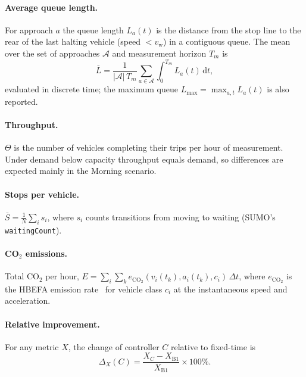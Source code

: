 \paragraph{Average queue length.} For approach $a$ the queue length $L_a(t)$ is the distance from the stop line to the rear of the last halting vehicle (speed $< v_{\text{w}}$) in a contiguous queue. The mean over the set of approaches $\mathcal{A}$ and measurement horizon $T_m$ is
\begin{equation}
  \bar{L} = \frac{1}{|\mathcal{A}|\,T_m}\sum_{a \in \mathcal{A}} \int_{0}^{T_m} L_a(t)\,\mathrm{d}t ,
  \label{eq:queue}
\end{equation}
evaluated in discrete time; the maximum queue $L_{\max} = \max_{a,t} L_a(t)$ is also reported.

\paragraph{Throughput.} $\Theta$ is the number of vehicles completing their trips per hour of measurement. Under demand below capacity throughput equals demand, so differences are expected mainly in the Morning scenario.

\paragraph{Stops per vehicle.} $\bar{S} = \frac{1}{N}\sum_i s_i$, where $s_i$ counts transitions from moving to waiting (SUMO's \texttt{waitingCount}).

\paragraph{CO$_2$ emissions.} Total CO$_2$ per hour, $E = \sum_i \sum_k e_{\text{CO}_2}(v_i(t_k), a_i(t_k), c_i)\,\Delta t$, where $e_{\text{CO}_2}$ is the HBEFA emission rate~\cite{hbefa41} for vehicle class $c_i$ at the instantaneous speed and acceleration.

\paragraph{Relative improvement.} For any metric $X$, the change of controller $C$ relative to fixed-time is
\begin{equation}
  \Delta_X(C) = \frac{X_C - X_{\text{B1}}}{X_{\text{B1}}} \times 100\% .
  \label{eq:relchange}
\end{equation}

